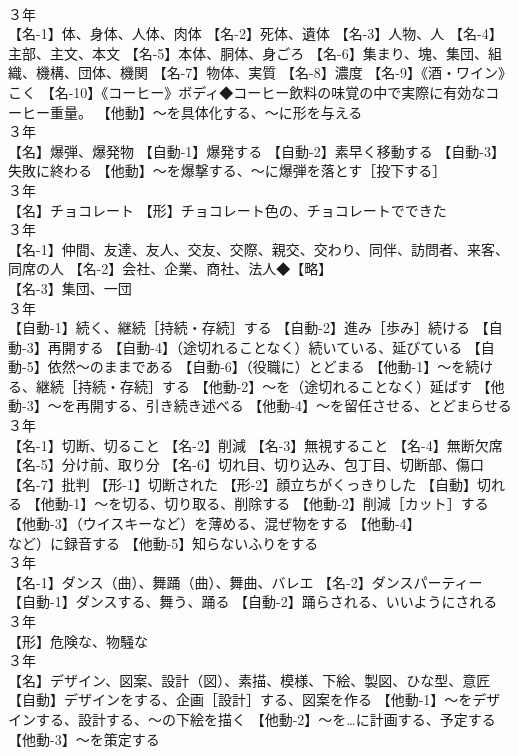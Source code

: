 \documentclass[8pt]{extreport}
\begin{document}
\begin{CJK}{UTF8}{min}
\\	３年	
\\	【名-1】体、身体、人体、肉体 【名-2】死体、遺体 【名-3】人物、人 【名-4】主部、主文、本文 【名-5】本体、胴体、身ごろ 【名-6】集まり、塊、集団、組織、機構、団体、機関 【名-7】物体、実質 【名-8】濃度 【名-9】《酒・ワイン》こく 【名-10】《コーヒー》ボディ◆コーヒー飲料の味覚の中で実際に有効なコーヒー重量。 【他動】～を具体化する、～に形を与える
\\	３年	
\\	【名】爆弾、爆発物 【自動-1】爆発する 【自動-2】素早く移動する 【自動-3】失敗に終わる 【他動】～を爆撃する、～に爆弾を落とす［投下する］
\\	３年	
\\	【名】チョコレート 【形】チョコレート色の、チョコレートでできた
\\	３年	
\\	【名-1】仲間、友達、友人、交友、交際、親交、交わり、同伴、訪問者、来客、同席の人 【名-2】会社、企業、商社、法人◆【略】
\\	【名-3】集団、一団
\\	３年	
\\	【自動-1】続く、継続［持続・存続］する 【自動-2】進み［歩み］続ける 【自動-3】再開する 【自動-4】（途切れることなく）続いている、延びている 【自動-5】依然～のままである 【自動-6】（役職に）とどまる 【他動-1】～を続ける、継続［持続・存続］する 【他動-2】～を（途切れることなく）延ばす 【他動-3】～を再開する、引き続き述べる 【他動-4】～を留任させる、とどまらせる
\\	３年	
\\	【名-1】切断、切ること 【名-2】削減 【名-3】無視すること 【名-4】無断欠席 【名-5】分け前、取り分 【名-6】切れ目、切り込み、包丁目、切断部、傷口 【名-7】批判 【形-1】切断された 【形-2】顔立ちがくっきりした 【自動】切れる 【他動-1】～を切る、切り取る、削除する 【他動-2】削減［カット］する 【他動-3】（ウイスキーなど）を薄める、混ぜ物をする 【他動-4】
\\	など）に録音する 【他動-5】知らないふりをする
\\	３年	
\\	【名-1】ダンス（曲）、舞踊（曲）、舞曲、バレエ 【名-2】ダンスパーティー 【自動-1】ダンスする、舞う、踊る 【自動-2】踊らされる、いいようにされる
\\	３年	
\\	【形】危険な、物騒な
\\	３年	
\\	【名】デザイン、図案、設計（図）、素描、模様、下絵、製図、ひな型、意匠 【自動】デザインをする、企画［設計］する、図案を作る 【他動-1】～をデザインする、設計する、～の下絵を描く 【他動-2】～を…に計画する、予定する 【他動-3】～を策定する

\end{CJK}
\end{document}
